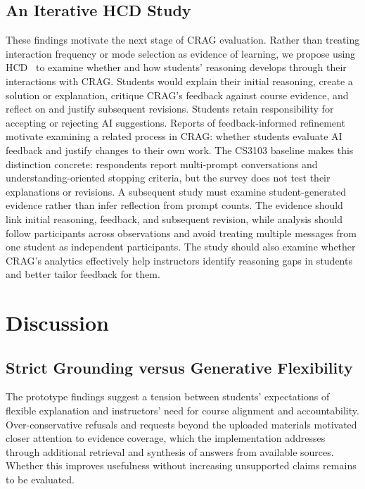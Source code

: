 \documentclass[conference]{IEEEtran}
\begin{document}
\subsection{An Iterative HCD Study}
These findings motivate the next stage of CRAG evaluation. Rather than treating interaction frequency or mode selection as evidence of learning, we propose using HCD~\cite{b_hcd1} to examine whether and how students' reasoning develops through their interactions with CRAG. Students would explain their initial reasoning, create a solution or explanation, critique CRAG's feedback against course evidence, and reflect on and justify subsequent revisions.
Students retain responsibility for accepting or rejecting AI suggestions. Reports of feedback-informed refinement~\cite{b_steps} motivate examining a related process in CRAG: whether students evaluate AI feedback and justify changes to their own work. The CS3103 baseline makes this distinction concrete: respondents report multi-prompt conversations and understanding-oriented stopping criteria, but the survey does not test their explanations or revisions. A subsequent study must examine student-generated evidence rather than infer reflection from prompt counts.
The evidence should link initial reasoning, feedback, and subsequent revision, while analysis should follow participants across observations and avoid treating multiple messages from one student as independent participants. The study should also examine whether CRAG's analytics effectively help instructors identify reasoning gaps in students and better tailor feedback for them.

\section{Discussion}

\subsection{Strict Grounding versus Generative Flexibility}
The prototype findings suggest a tension between students' expectations of flexible explanation and instructors' need for course alignment and accountability. Over-conservative refusals and requests beyond the uploaded materials motivated closer attention to evidence coverage, which the implementation addresses through additional retrieval and synthesis of answers from available sources. Whether this improves usefulness without increasing unsupported claims remains to be evaluated.
\end{document}
